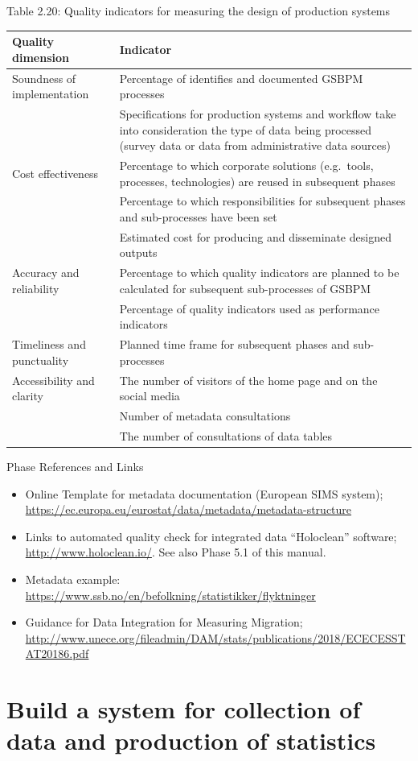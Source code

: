\documentclass[
]{article}
\begin{document}
Table 2.20: Quality indicators for measuring the design of production
systems

\begin{longtable}[]{@{}ll@{}}
\toprule
\textbf{Quality dimension} & \textbf{Indicator}\tabularnewline
\midrule
\endhead
Soundness of implementation & Percentage of identifies and documented GSBPM processes\tabularnewline
& Specifications for production systems and workflow take into consideration the type of data being processed (survey data or data from administrative data sources)\tabularnewline
Cost effectiveness & Percentage to which corporate solutions (e.g.~tools, processes, technologies) are reused in subsequent phases\tabularnewline
& Percentage to which responsibilities for subsequent phases and sub-processes have been set\tabularnewline
& Estimated cost for producing and disseminate designed outputs\tabularnewline
Accuracy and reliability & Percentage to which quality indicators are planned to be calculated for subsequent sub-processes of GSBPM\tabularnewline
& Percentage of quality indicators used as performance indicators\tabularnewline
Timeliness and punctuality & Planned time frame for subsequent phases and sub-processes\tabularnewline
Accessibility and clarity & The number of visitors of the home page and on the social media\tabularnewline
& Number of metadata consultations\tabularnewline
& The number of consultations of data tables\tabularnewline
\bottomrule
\end{longtable}

Phase References and Links

\begin{itemize}
\item
  Online Template for metadata documentation (European SIMS system);
  \url{https://ec.europa.eu/eurostat/data/metadata/metadata-structure}
\item
  Links to automated quality check for integrated data ``Holoclean''
  software; \url{http://www.holoclean.io/}. See also Phase 5.1 of this
  manual.
\item
  Metadata example:
  \url{https://www.ssb.no/en/befolkning/statistikker/flyktninger}
\item
  Guidance for Data Integration for Measuring Migration;
  \url{http://www.unece.org/fileadmin/DAM/stats/publications/2018/ECECESSTAT20186.pdf}
\end{itemize}

\hypertarget{build-a-system-for-collection-of-data-and-production-of-statistics-1}{%
\section{Build a system for collection of data and production of statistics}\label{build-a-system-for-collection-of-data-and-production-of-statistics-1}}
\end{document}
